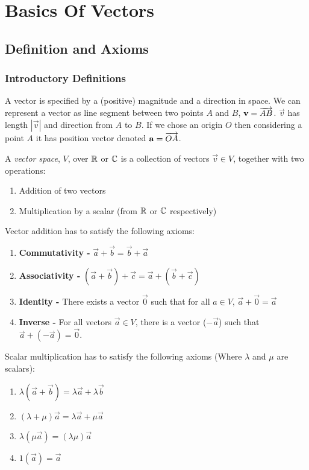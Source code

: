 \documentclass[../main.tex]{subfiles}
\begin{document}
\chapter{Basics Of Vectors}
\section{Definition and Axioms}
\subsection{Introductory Definitions}
A vector is specified by a (positive) magnitude and a direction in space.
We can represent a vector as line segment between two points $A$ and $B$, $\boldsymbol{\mathbf{v}} = \overrightarrow{AB}$.
$\vec{v}$ has length $|\vec{v}|$ and direction from $A$ to $B$.
If we chose an origin $O$ then considering a point $A$ it has position vector denoted $\boldsymbol{\mathbf{a}} = \overrightarrow{OA}$.
\label{vectorSpaceDef}
\begin{definition}
  A \textit{vector space}, $V$, over $\mathbb{R}$ or $\mathbb{C}$ is a collection of vectors $\vec{v} \in V$, together with two operations:
  \begin{enumerate}
    \item Addition of two vectors
    \item Multiplication by a scalar (from $\mathbb{R}$ or $\mathbb{C}$ respectively)
  \end{enumerate}
\end{definition}
Vector addition has to satisfy the following axioms:
\begin{enumerate}
  \item \textbf{Commutativity -} $\vec{a} + \vec{b} = \vec{b} + \vec{a}$
  \item \textbf{Associativity -} $(\vec{a} + \vec{b}) + \vec{c} = \vec{a} + (\vec{b} + \vec{c})$
  \item \textbf{Identity -} There exists a vector $\vec{0}$ such that for all $a \in V$, $\vec{a} + \vec{0} = \vec{a}$
  \item \textbf{Inverse -} For all vectors $\vec{a} \in V$, there is a vector ($-\vec{a}$) such that $\vec{a} + (-\vec{a}) = \vec{0}$.
\end{enumerate}
Scalar multiplication has to satisfy the following axioms (Where $\lambda$ and $\mu$ are scalars):
\begin{enumerate}
  \item $\lambda(\vec{a} + \vec{b}) = \lambda \vec{a} + \lambda \vec{b}$
  \item $(\lambda + \mu)\vec{a} = \lambda \vec{a} + \mu \vec{a}$
  \item $\lambda(\mu \vec{a}) = (\lambda \mu)\vec{a}$
  \item $1(\vec{a}) = \vec{a}$
\end{enumerate}
\end{document}
